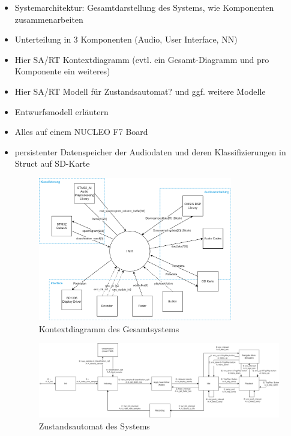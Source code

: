 \begin{itemize}
    \item Systemarchitektur: Gesamtdarstellung des Systems, wie Komponenten zusammenarbeiten
    \item Unterteilung in 3 Komponenten (Audio, User Interface, NN)
    \item Hier SA/RT Kontextdiagramm (evtl. ein Gesamt-Diagramm und pro Komponente ein weiteres)
    \item Hier SA/RT Modell für Zustandsautomat? und ggf. weitere Modelle
    \item Entwurfsmodell erläutern
    \item Alles auf einem NUCLEO F7 Board
    \item persistenter Datenspeicher der Audiodaten und deren Klassifizierungen in Struct auf SD-Karte
    
    \begin{figure}[H]
    	\centering
    	\includegraphics[width=0.8\textwidth]{images/04_spezifikation/kontextdiagramm_gesamt.drawio.png}
    	\caption{Kontextdiagramm des Gesamtsystems}
    	\label{fig:context_diagram_gesamt}
    \end{figure}
    
    
   
    
    \begin{figure}[H]
    	\centering
    	\includegraphics[width=1.0\textwidth]{images/04_spezifikation/fsm.drawio.png}
    	\caption{Zustandsautomat des Systems}
    	\label{fig:fsm}
    \end{figure}
    

\end{itemize}

